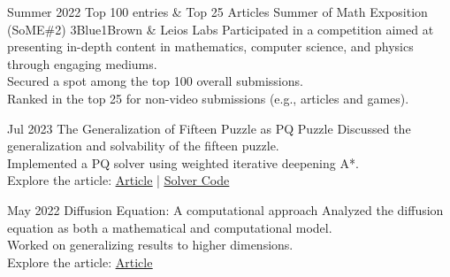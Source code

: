 \documentclass[hidelinks]{report}
\begin{document}
\entry
    {Summer 2022}
    {Top 100 entries \& Top 25 Articles}
    {Summer of Math Exposition (SoME\#2)}
    {3Blue1Brown \& Leios Labs}  
    {
        \textbullet Participated in a competition aimed at presenting in-depth content in mathematics, computer science, and physics through engaging mediums.\\
        \textbullet Secured a spot among the top 100 overall submissions.\\
        \textbullet Ranked in the top 25 for non-video submissions (e.g., articles and games).\\
    }

\vspace{4mm}





\entry
    {Jul 2023}
    {The Generalization of Fifteen Puzzle as PQ Puzzle}  
    {} {}
    {
      \textbullet Discussed the generalization and solvability of the fifteen puzzle.\\
      \textbullet Implemented a PQ solver using weighted iterative deepening A*.\\
      \textbullet Explore the article:  \href{\blog/fifteen-puzzle}{\underline{Article}} | 
      \href{\github/fifteen-puzzle-solver}{\underline{Solver Code}}
    } 


\entry
    {May 2022}
    {Diffusion Equation: A computational approach}  
    {} 
    {}
    {
        \textbullet Analyzed the diffusion equation as both a mathematical and computational model.\\
        \textbullet Worked on generalizing results to higher dimensions.\\
        \textbullet Explore the article: \href{\blog/diffusion}{\underline{Article}}
    }

\vspace{2mm}


\end{document}

